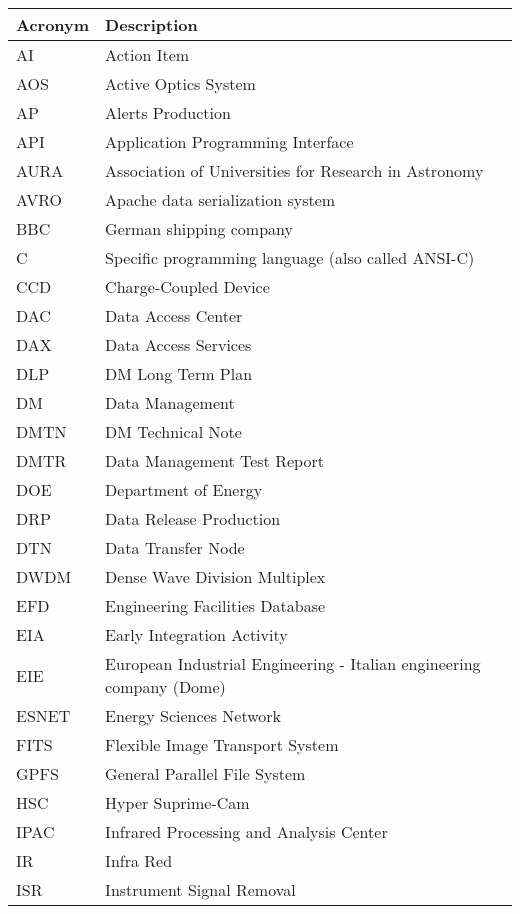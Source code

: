 \addtocounter{table}{-1}
\begin{longtable}{|l|p{}|}\hline
\textbf{Acronym} & \textbf{Description}  \\\hline

AI & Action Item \\\hline
AOS & Active Optics System \\\hline
AP & Alerts Production \\\hline
API & Application Programming Interface \\\hline
AURA & Association of Universities for Research in Astronomy \\\hline
AVRO & Apache data serialization system \\\hline
BBC & German shipping company \\\hline
C & Specific programming language (also called ANSI-C) \\\hline
CCD & Charge-Coupled Device \\\hline
DAC & Data Access Center \\\hline
DAX & Data Access Services \\\hline
DLP & DM Long Term Plan \\\hline
DM & Data Management \\\hline
DMTN & DM Technical Note \\\hline
DMTR & Data Management Test Report \\\hline
DOE & Department of Energy \\\hline
DRP & Data Release Production \\\hline
DTN & Data Transfer Node \\\hline
DWDM & Dense Wave Division Multiplex \\\hline
EFD & Engineering Facilities Database \\\hline
EIA & Early Integration Activity \\\hline
EIE & European Industrial Engineering  - Italian engineering company (Dome) \\\hline
ESNET & Energy Sciences Network \\\hline
FITS & Flexible Image Transport System \\\hline
GPFS & General Parallel File System \\\hline
HSC & Hyper Suprime-Cam \\\hline
IPAC & Infrared Processing and Analysis Center \\\hline
IR & Infra Red \\\hline
ISR & Instrument Signal Removal \\\hline

\end{longtable}
